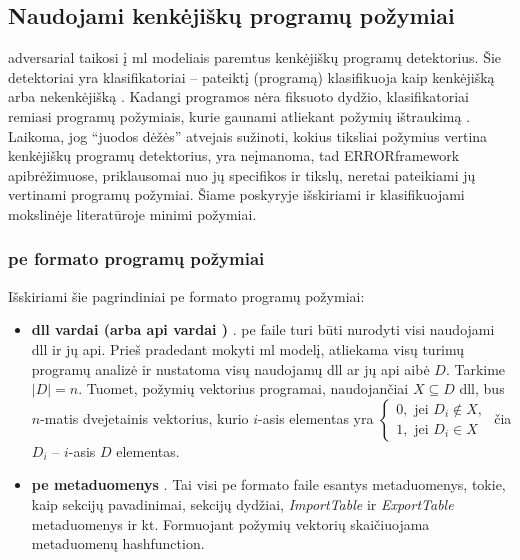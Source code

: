 \subsection{Naudojami kenkėjiškų programų požymiai}\label{sec:literature:features}
\Gls{adversarial} taikosi į \gls{ml} modeliais paremtus kenkėjiškų programų detektorius. Šie detektoriai yra klasifikatoriai -- pateiktį (programą) klasifikuoja kaip kenkėjišką  arba nekenkėjišką . Kadangi programos nėra fiksuoto dydžio, klasifikatoriai remiasi programų požymiais, kurie gaunami atliekant požymių ištraukimą . Laikoma, jog \enquote{juodos dėžės} atvejais sužinoti, kokius tiksliai požymius vertina kenkėjiškų programų detektorius, yra neįmanoma, tad ERROR\gls{framework} apibrėžimuose, priklausomai nuo jų specifikos ir tikslų, neretai pateikiami jų vertinami programų požymiai. Šiame poskyryje išskiriami ir klasifikuojami mokslinėje literatūroje minimi požymiai.

\subsubsection{\gls{pe} formato programų požymiai}\label{sec:literature:features:pe}
Išskiriami šie pagrindiniai \gls{pe} formato programų požymiai:
\begin{itemize}
    \item \textbf{\gls{dll} vardai (arba \gls{api} vardai \cite{huGeneratingAdversarialMalware2017})} \cite{zhongMalFoxCamouflagedAdversarial2024}. \gls{pe} faile turi būti nurodyti visi naudojami \gls{dll} ir jų \gls{api}. Prieš pradedant mokyti \gls{ml} modelį, atliekama visų turimų programų analizė ir nustatoma visų naudojamų \gls{dll} ar jų \gls{api} aibė $D$. Tarkime $|D| = n$. Tuomet, požymių vektorius programai, naudojančiai $X \subseteq D$ \gls{dll}, bus $n$-matis dvejetainis vektorius, kurio $i$-asis elementas yra $\begin{cases}
        0, \text{ jei } D_i \not \in X, \\
        1, \text{ jei } D_i \in X
    \end{cases}$ čia $D_i$ -- $i$-asis $D$ elementas.
    \item \textbf{\gls{pe} metaduomenys} \cite{andersonLearningEvadeStatic2018}. Tai visi \gls{pe} formato faile esantys metaduomenys, tokie, kaip sekcijų pavadinimai, sekcijų dydžiai, \textit{ImportTable} ir \textit{ExportTable} metaduomenys ir kt. Formuojant požymių vektorių skaičiuojama metaduomenų \gls{hashfunction}.
\end{itemize}

